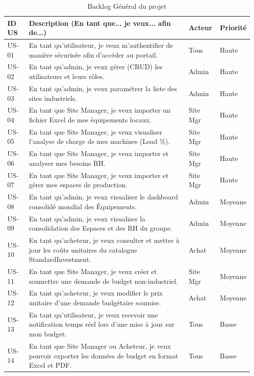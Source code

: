 \begin{table}[h]
\centering
\begin{tabular}{|p{2cm}|p{8cm}|p{2cm}|p{2cm}|}
\hline
\textbf{ID US} & \textbf{Description (En tant que... je veux... afin de...)} & \textbf{Acteur} & \textbf{Priorité} \\ \hline
US-01 & En tant qu'utilisateur, je veux m'authentifier de manière sécurisée afin d'accéder au portail. & Tous & Haute \\ \hline
US-02 & En tant qu'admin, je veux gérer (CRUD) les utilisateurs et leurs rôles. & Admin & Haute \\ \hline
US-03 & En tant qu'admin, je veux paramétrer la liste des sites industriels. & Admin & Haute \\ \hline
US-04 & En tant que Site Manager, je veux importer un fichier Excel de mes équipements locaux. & Site Mgr & Haute \\ \hline
US-05 & En tant que Site Manager, je veux visualiser l'analyse de charge de mes machines (Load \%). & Site Mgr & Haute \\ \hline
US-06 & En tant que Site Manager, je veux importer et analyser mes besoins RH. & Site Mgr & Haute \\ \hline
US-07 & En tant que Site Manager, je veux importer et gérer mes espaces de production. & Site Mgr & Haute \\ \hline
US-08 & En tant qu'admin, je veux visualiser le dashboard consolidé mondial des Équipements. & Admin & Moyenne \\ \hline
US-09 & En tant qu'admin, je veux visualiser la consolidation des Espaces et des RH du groupe. & Admin & Moyenne \\ \hline
US-10 & En tant qu'acheteur, je veux consulter et mettre à jour les coûts unitaires du catalogue StandardInvestment. & Achat & Moyenne \\ \hline
US-11 & En tant que Site Manager, je veux créer et soumettre une demande de budget non-industriel. & Site Mgr & Moyenne \\ \hline
US-12 & En tant qu'acheteur, je veux modifier le prix unitaire d'une demande budgétaire soumise. & Achat & Moyenne \\ \hline
US-13 & En tant qu'utilisateur, je veux recevoir une notification temps réel lors d'une mise à jour sur mon budget. & Tous & Basse \\ \hline
US-14 & En tant que Site Manager ou Acheteur, je veux pouvoir exporter les données de budget en format Excel et PDF. & Tous & Basse \\ \hline
\end{tabular}
\caption{Backlog Général du projet}
\label{tab:backlog}
\end{table}

